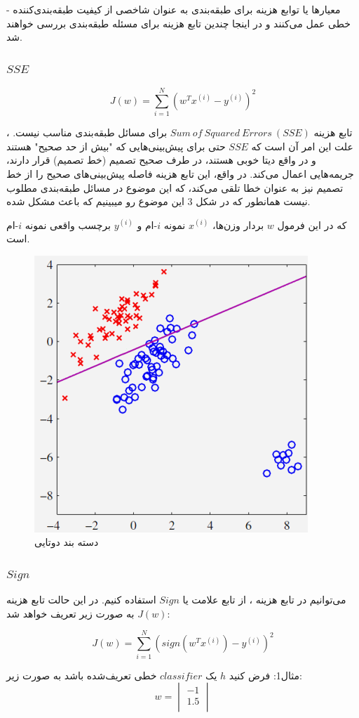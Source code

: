 \documentclass[12pt]{article}
\begin{document}
- معیارها یا توابع هزینه برای طبقه‌بندی به عنوان شاخصی از کیفیت طبقه‌بندی‌کننده خطی عمل می‌کنند و در اینجا چندین تابع هزینه برای مسئله طبقه‌بندی بررسی خواهند شد.
\subsubsection{$SSE$}

\[ J(w) = \sum_{i=1}^{N} (w^T x^{(i)} - y^{(i)})^2 \]

، تابع هزینه $Sum\:of\:Squared\:Errors\:(SSE)$ برای مسائل طبقه‌بندی مناسب نیست. علت این امر آن است که $SSE$ حتی برای پیش‌بینی‌هایی که "بیش از حد صحیح" هستند و در واقع دیتا خوبی هستند، در طرف صحیح تصمیم (خط تصمیم) قرار دارند، جریمه‌هایی اعمال می‌کند. در واقع، این تابع هزینه فاصله پیش‌بینی‌های صحیح را از خط تصمیم نیز به عنوان خطا تلقی می‌کند، که این موضوع در مسائل طبقه‌بندی مطلوب نیست همانطور که در شکل 3 این موضوع رو میبینیم که باعث مشکل شده.

که در این فرمول \( w \) بردار وزن‌ها، \( x^{(i)} \) نمونه $i$-ام و \( y^{(i)} \) برچسب واقعی نمونه $i$-ام است. 
\begin{figure}
    \centering
    \includegraphics[width=0.5\linewidth]{image3.png}
    \caption{دسته بند دوتایی}
    \label{fig:enter-label}
\end{figure}

\subsubsection{$Sign$}

می‌توانیم در تابع هزینه ، از تابع علامت یا $Sign$ استفاده کنیم. در این حالت تابع هزینه \( J(w) \) به صورت زیر تعریف خواهد شد:

\[ J(w) = \sum_{i=1}^{N} (\text{$sign$}(w^Tx^{(i)}) - y^{(i)})^2 \]


مثال1: فرض کنید $h$ یک $classifier$ خطی تعریف‌شده باشد به صورت زیر:
\[
w=\begin{vmatrix}
-1 \\
1.5 \\
\end{vmatrix}
\]
\end{document}
